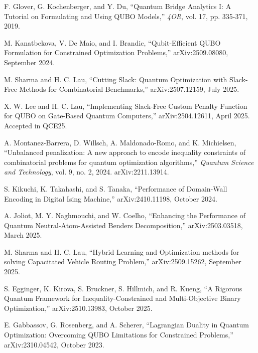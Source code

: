 \documentclass[11pt,a4paper]{article}
\begin{document}
\begin{thebibliography}{99}

F. Glover, G. Kochenberger, and Y. Du, 
``Quantum Bridge Analytics I: A Tutorial on Formulating and Using QUBO Models,''
\emph{4OR}, vol. 17, pp. 335-371, 2019.

M. Kanatbekova, V. De Maio, and I. Brandic,
``Qubit-Efficient QUBO Formulation for Constrained Optimization Problems,''
arXiv:2509.08080, September 2024.

M. Sharma and H. C. Lau,
``Cutting Slack: Quantum Optimization with Slack-Free Methods for Combinatorial Benchmarks,''
arXiv:2507.12159, July 2025.

X. W. Lee and H. C. Lau,
``Implementing Slack-Free Custom Penalty Function for QUBO on Gate-Based Quantum Computers,''
arXiv:2504.12611, April 2025.
Accepted in QCE25.

A. Montanez-Barrera, D. Willsch, A. Maldonado-Romo, and K. Michielsen,
``Unbalanced penalization: A new approach to encode inequality constraints of combinatorial problems for quantum optimization algorithms,''
\emph{Quantum Science and Technology}, vol. 9, no. 2, 2024.
arXiv:2211.13914.

S. Kikuchi, K. Takahashi, and S. Tanaka,
``Performance of Domain-Wall Encoding in Digital Ising Machine,''
arXiv:2410.11198, October 2024.

A. Joliot, M. Y. Naghmouchi, and W. Coelho,
``Enhancing the Performance of Quantum Neutral-Atom-Assisted Benders Decomposition,''
arXiv:2503.03518, March 2025.

M. Sharma and H. C. Lau,
``Hybrid Learning and Optimization methods for solving Capacitated Vehicle Routing Problem,''
arXiv:2509.15262, September 2025.

S. Egginger, K. Kirova, S. Bruckner, S. Hillmich, and R. Kueng,
``A Rigorous Quantum Framework for Inequality-Constrained and Multi-Objective Binary Optimization,''
arXiv:2510.13983, October 2025.

E. Gabbassov, G. Rosenberg, and A. Scherer,
``Lagrangian Duality in Quantum Optimization: Overcoming QUBO Limitations for Constrained Problems,''
arXiv:2310.04542, October 2023.

\end{thebibliography}
\end{document}
